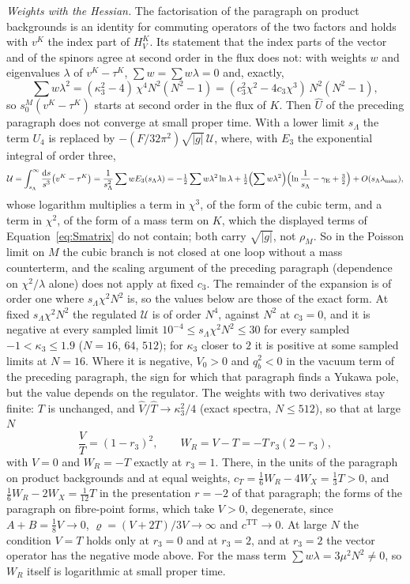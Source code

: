 \emph{Weights with the Hessian.} The factorisation of the paragraph on product backgrounds is an identity for commuting operators of the two factors and holds with \(v^K\) the index part of \(H_V^K\). Its statement that the index parts of the vector and of the spinors agree at second order in the flux does not: with weights \(w\) and eigenvalues \(\lambda\) of \(v^K-\tau^K\), \(\sum w=\sum w\lambda=0\) and, exactly,
\[
  \sum w\lambda^2=(\kappa_3^2-4)\,\chi^4N^2(N^2-1)=(c_3^2\chi^2-4c_3\chi^3)\,N^2(N^2-1),
\]
so \(s_0^M(v^K-\tau^K)\) starts at second order in the flux of \(K\). Then \(\hat U\) of the preceding paragraph does not converge at small proper time. With a lower limit \(s_\Lambda\) the term \(U_4\) is replaced by \(-(F/32\pi^2)\sqrt{|g|}\,\mathcal U\), where, with \(E_3\) the exponential integral of order three,
\[
  \mathcal U=\int_{s_\Lambda}^\infty\frac{\mathrm ds}{s^3}\bigl(v^K-\tau^K\bigr)
  =\frac1{s_\Lambda^2}\sum wE_3(s_\Lambda\lambda)
  =-\tfrac12\sum w\lambda^2\ln\lambda+\tfrac12\Bigl(\sum w\lambda^2\Bigr)\Bigl(\ln\frac1{s_\Lambda}-\gamma_{\mathrm E}+\tfrac32\Bigr)+O(s_\Lambda\lambda_{\max}),
\]
whose logarithm multiplies a term in \(\chi^3\), of the form of the cubic term, and a term in \(\chi^2\), of the form of a mass term on \(K\), which the displayed terms of Equation~\eqref{eq:Smatrix} do not contain; both carry \(\sqrt{|g|}\), not \(\rho_M\). So in the Poisson limit on \(M\) the cubic branch is not closed at one loop without a mass counterterm, and the scaling argument of the preceding paragraph (dependence on \(\chi^2/\lambda\) alone) does not apply at fixed \(c_3\). The remainder of the expansion is of order one where \(s_\Lambda\chi^2N^2\) is, so the values below are those of the exact form. At fixed \(s_\Lambda\chi^2N^2\) the regulated \(\mathcal U\) is of order \(N^4\), against \(N^2\) at \(c_3=0\), and it is negative at every sampled limit \(10^{-4}\le s_\Lambda\chi^2N^2\le30\) for every sampled \(-1<\kappa_3\le1.9\) (\(N=16\), \(64\), \(512\)); for \(\kappa_3\) closer to \(2\) it is positive at some sampled limits at \(N=16\). Where it is negative, \(V_0>0\) and \(q_b^2<0\) in the vacuum term of the preceding paragraph, the sign for which that paragraph finds a Yukawa pole, but the value depends on the regulator. The weights with two derivatives stay finite: \(T\) is unchanged, and \(\hat V/\hat T\to\kappa_3^2/4\) (exact spectra, \(N\le512\)), so that at large \(N\)
\[
  \frac VT=(1-r_3)^2,\qquad W_R=V-T=-T\,r_3(2-r_3),
\]
with \(V=0\) and \(W_R=-T\) exactly at \(r_3=1\). There, in the units of the paragraph on product backgrounds and at equal weights, \(c_T=\tfrac16W_R-4W_X=\tfrac13T>0\), and \(\tfrac16W_R-2W_X=\tfrac1{12}T\) in the presentation \(r=-2\) of that paragraph; the forms of the paragraph on fibre-point forms, which take \(V>0\), degenerate, since \(A+B=\tfrac18V\to0\), \(\varrho=(V+2T)/3V\to\infty\) and \(c^{\mathrm{TT}}\to0\). At large \(N\) the condition \(V=T\) holds only at \(r_3=0\) and at \(r_3=2\), and at \(r_3=2\) the vector operator has the negative mode above. For the mass term \(\sum w\lambda=3\mu^2N^2\ne0\), so \(W_R\) itself is logarithmic at small proper time.


